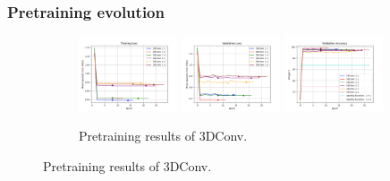 \documentclass{beamer}
\begin{document}
\begin{frame}
    \frametitle{Pretraining evolution}
    \begin{figure}[htbp]
        \centering
         \begin{subfigure}[b]{\textwidth}
             \centering
             \includegraphics[width=0.32\textwidth]{../report/entities/pretrained/baseline/train_losses.png}
             \includegraphics[width=0.32\textwidth]{../report/entities/pretrained/baseline/val_losses.png}
             \includegraphics[width=0.32\textwidth]{../report/entities/pretrained/baseline/val_accs.png}
             \caption{Pretraining results of 3DConv.}
         \end{subfigure}
        \hfill
    

\end{figure}
\end{frame}
\end{document}
